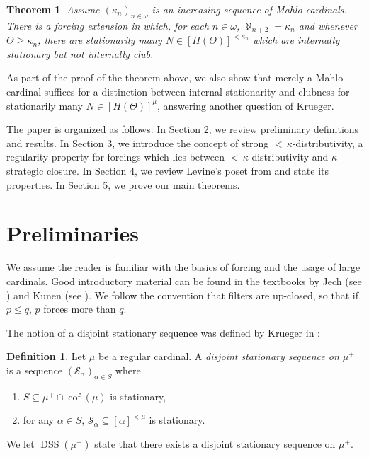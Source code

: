 \documentclass[12pt]{amsart}
\theoremstyle{definition}
\newtheorem{mydef}{Definition}[section]
\theoremstyle{remark}
\theoremstyle{plain}
\newtheorem{mysenx}{Theorem}
\numberwithin{mydef}{section}
\DeclareMathOperator{\cof}{cof}
\DeclareMathOperator{\DSS}{DSS}
\begin{document}
	\begin{mysenx}\label{Thm2}
		Assume $(\kappa_n)_{n\in\omega}$ is an increasing sequence of Mahlo cardinals. There is a forcing extension in which, for each $n\in\omega$, $\aleph_{n+2}=\kappa_n$ and whenever $\Theta\geq\kappa_n$, there are stationarily many $N\in[H(\Theta)]^{<\kappa_n}$ which are internally stationary but not internally club.
	\end{mysenx}
	
	As part of the proof of the theorem above, we also show that merely a Mahlo cardinal suffices for a distinction between internal stationarity and clubness for stationarily many $N\in[H(\Theta)]^{\mu}$, answering another question of Krueger.
	
	The paper is organized as follows: In Section 2, we review preliminary definitions and results. In Section 3, we introduce the concept of strong ${<}\,\kappa$-distributivity, a regularity property for forcings which lies between ${<}\,\kappa$-distributivity and $\kappa$-strategic closure. In Section 4, we review Levine's poset from \cite{LevineDisjointStatSeq} and state its properties. In Section 5, we prove our main theorems.
	
	\section{Preliminaries}
	
	We assume the reader is familiar with the basics of forcing and the usage of large cardinals. Good introductory material can be found in the textbooks by Jech (see \cite{JechSetTheory}) and Kunen (see \cite{KunenSetTheory}). We follow the convention that filters are up-closed, so that if $p\leq q$, $p$ forces more than $q$.
	
	The notion of a disjoint stationary sequence was defined by Krueger in \cite{KruegerApplicMSI}:
	
	\begin{mydef}
		Let $\mu$ be a regular cardinal. A \emph{disjoint stationary sequence on $\mu^+$} is a sequence $(\mathcal{S}_{\alpha})_{\alpha\in S}$ where
		\begin{enumerate}
			\item $S\subseteq\mu^+\cap\cof(\mu)$ is stationary,
			\item for any $\alpha\in S$, $\mathcal{S}_{\alpha}\subseteq[\alpha]^{<\mu}$ is stationary.
		\end{enumerate}
		We let $\DSS(\mu^+)$ state that there exists a disjoint stationary sequence on $\mu^+$.
	\end{mydef}
	
\end{document}
